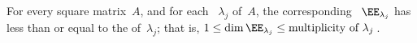 \begin{theorem} \label{thm:dimee} 
For every square matrix~\(A\), and for each ~\(\lambda_j\) of~\(A\), the corresponding ~\(\EE_{\lambda_j}\) has  less than or equal to the  of~\(\lambda_j\);
that is, \(1\leq\dim\EE_{\lambda_j}\leq\text{multiplicity of }\lambda_j\)\,.  
\end{theorem}
